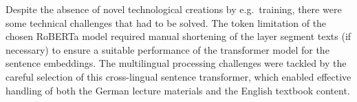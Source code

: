 




Despite the absence of novel technological creations by e.g.\ training, there were some technical challenges that had to be solved. The token limitation of the chosen RoBERTa model required manual shortening of the layer segment texts (if necessary) to ensure a suitable performance of the transformer model for the sentence embeddings. The multilingual processing challenges were tackled by the careful selection of this cross-lingual sentence transformer, which enabled effective handling of both the German lecture materials and the English textbook content.

